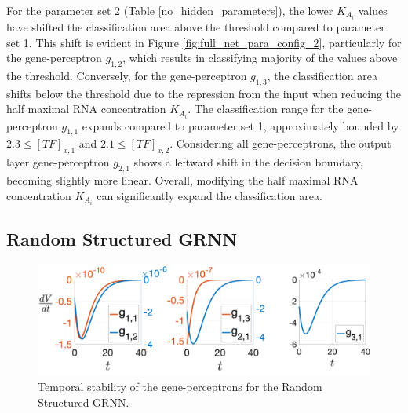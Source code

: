 \documentclass[twocolumn]{biophys-new}
\begin{document}
{{For the parameter set 2 (Table \ref{no_hidden_parameters}), the lower $K_{A_i}$ values have shifted the classification area above the threshold compared to parameter set 1. 
This shift is evident in Figure \ref{fig:full_net_para_config_2}, particularly for the gene-perceptron $g_{1,2}$, which results in  classifying majority of the values above the threshold. Conversely, for the gene-perceptron $g_{1,3}$, the classification area shifts below the threshold due to the  repression from the input when reducing the  half maximal RNA concentration $K_{A_i}$. The classification range for the gene-perceptron $g_{1,1}$ expands compared to parameter set 1, approximately bounded by $2.3\leq [TF]_{x,1} $ and $2.1\leq [TF]_{x,2} $. Considering all gene-perceptrons, the output layer gene-perceptron $g_{2,1}$ shows a leftward shift in the decision boundary, becoming slightly more linear.  Overall, modifying the  half maximal RNA concentration $K_{A_i}$ can significantly expand the classification area. 
\subsection*{Random Structured GRNN} \label{hidden_net_results}

\begin{figure}[t!] %
\centering
\includegraphics[width=\linewidth]{figures/temporal_stab_net2.pdf}
\caption{Temporal stability of the gene-perceptrons for the Random Structured GRNN. \vspace{-0.5em} }
\label{fig:Lypunov_temporal_stability_net2}
\vspace{-0.5em}
\end{figure}

}}
\end{document}
